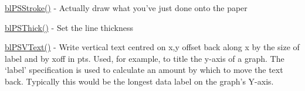 \begin{DoxyItemize}
\item \hyperlink{ps_8c_a25a2f7abeb3112ab8d9587faaee884c9}{bl\-P\-S\-Stroke()} -\/ Actually draw what you've just done onto the paper
\item \hyperlink{ps_8c_a92271e485b9c4be0bdc3e632a506e090}{bl\-P\-S\-Thick()} -\/ Set the line thickness
\item \hyperlink{ps_8c_a0f3539a3142cccad90210db5ded98f3e}{bl\-P\-S\-V\-Text()} -\/ Write vertical text centred on x,y offset back along x by the size of label and by xoff in pts. Used, for example, to title the y-\/axis of a graph. The `label' specification is used to calculate an amount by which to move the text back. Typically this would be the longest data label on the graph's Y-\/axis. 
\end{DoxyItemize}